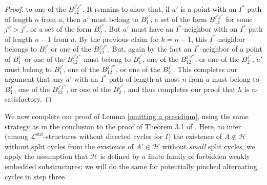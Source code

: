 \documentclass{amsart}
\theoremstyle{definition}
\theoremstyle{remark}
\numberwithin{equation}{section}
\begin{document}
\begin{proof}
to one of the $B_{12}^{j'j''}$. It remains to show that, if $a'$ is a point with an $I^{*}$-path of length $n$ from $a$, then $a'$ must belong to $B_{1}^{j'}$, a set of the form $B_{12}^{j'j''}$ for some $j'' >j'$, or a set of the form $B^{j''}_{2}$. But $a'$ must have an $I^{*}$-neighbor with an $I^{*}$-path of length $n-1$ from $a$. By the previous claim for $k = n-1$, this $I^{*}$-neighbor belongs to $B_{1}^{j'}$ or one of the $B_{12}^{j'j''}$. But, again by the fact an $I^{*}$-neighbor of a point of $B_{1}^{j'}$ or one of the $B_{12}^{j'j''}$ must belong to $B_{1}^{j'}$, one of the $B_{12}^{j'j''}$, or one of the $B^{j''}_{2}$, $a'$ must belong to $B_{1}^{j'}$, one of the $B_{12}^{j'j''}$, or one of the $B^{j''}_{2}$. This completes our argument that any $a'$ with an $I^{*}$-path of length at most $n$ from $a$ must belong to  $B_{1}^{j'}$, one of the $B_{12}^{j'j''}$, or one of the $B^{j''}_{2}$, and thus completes our proof that $h$ is $n$-satisfactory.
    
\end{proof}

We now complete our proof of Lemma \ref{omitting a presidium}, using the same strategy as in the conclusion to the proof of Theorem 3.1 of \cite{ApproxOrder}. Here, to infer (among $\mathcal{L}^{\mathrm{std}}$-structures without directed cycles for $I$) the existence of $A \notin \mathcal{H}$ without split cycles from the existence of $A' \in \mathcal{H}$ without \textit{small} split cycles, we apply the assumption that $\mathcal{H}$ is defined by a finite family of forbidden weakly embedded substructures; we will do the same for potentially pinched alternating cycles in step three.
\end{document}
